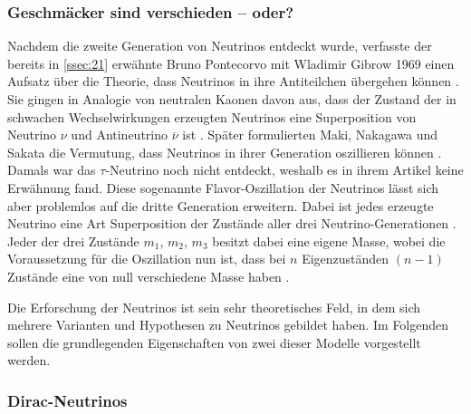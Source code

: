 \documentclass[a4paper,12pt]{article}
\begin{document}
\subsubsection{Geschmäcker sind verschieden -- oder?} \label{sssec:223}
Nachdem die zweite Generation von Neutrinos entdeckt wurde, verfasste der bereits in \cref{ssec:21} erwähnte Bruno Pontecorvo mit Wladimir Gibrow 1969 einen Aufsatz über die Theorie, dass Neutrinos in ihre Antiteilchen übergehen können \cite{Bilenky2014}. Sie gingen in Analogie von neutralen Kaonen davon aus, dass der Zustand der in schwachen Wechselwirkungen erzeugten Neutrinos eine Superposition von Neutrino $\nu$ und Antineutrino $\overline{\nu}$ ist \cite[10]{Athar2022}. Später formulierten Maki, Nakagawa und Sakata die Vermutung, dass Neutrinos in ihrer Generation oszillieren können \cite[870--871]{Maki1962}. Damals war das $\tau$-Neutrino noch nicht entdeckt, weshalb es in ihrem Artikel keine Erwähnung fand. Diese sogenannte Flavor-Oszillation der Neutrinos lässt sich aber problemlos auf die dritte Generation erweitern. Dabei ist jedes erzeugte Neutrino eine Art Superposition der Zustände aller drei Neutrino-Generationen \cite[10]{Athar2022}. Jeder der drei Zustände $m_1$, $m_2$, $m_3$ besitzt dabei eine eigene Masse, wobei die Voraussetzung für die Oszillation nun ist, dass bei $n$ Eigenzuständen $(n-1)$ Zustände eine von null verschiedene Masse haben \cite[10]{Athar2022}. \par 
Die Erforschung der Neutrinos ist sein sehr theoretisches Feld, in dem sich mehrere Varianten und Hypothesen zu Neutrinos gebildet haben. Im Folgenden sollen die grundlegenden Eigenschaften von zwei dieser Modelle vorgestellt werden. \par
\subsubsection{Dirac-Neutrinos} \label{sssec:224}
\end{document}
